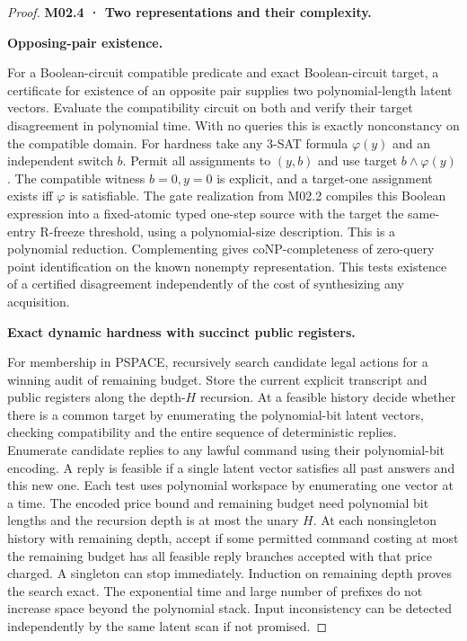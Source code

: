 \begin{proof}
\textbf{M02.4 · Two representations and their complexity.}

\textbf{Opposing-pair existence.}

For a Boolean-circuit compatible predicate and exact Boolean-circuit target, a certificate for existence of an opposite pair supplies two polynomial-length latent vectors. Evaluate the compatibility circuit on both and verify their target disagreement in polynomial time. With no queries this is exactly nonconstancy on the compatible domain. For hardness take any 3-SAT formula \(\varphi(y)\) and an independent switch \(b\). Permit all assignments to \((y,b)\) and use target \(b\land \varphi(y)\). The compatible witness \(b=0,y=0\) is explicit, and a target-one assignment exists iff \(\varphi\) is satisfiable. The gate realization from M02.2 compiles this Boolean expression into a fixed-atomic typed one-step source with the target the same-entry R-freeze threshold, using a polynomial-size description. This is a polynomial reduction. Complementing gives coNP-completeness of zero-query point identification on the known nonempty representation. This tests existence of a certified disagreement independently of the cost of synthesizing any acquisition.

\textbf{Exact dynamic hardness with succinct public registers.}

For membership in PSPACE, recursively search candidate legal actions for a winning audit of remaining budget. Store the current explicit transcript and public registers along the depth-\(H\) recursion. At a feasible history decide whether there is a common target by enumerating the polynomial-bit latent vectors, checking compatibility and the entire sequence of deterministic replies. Enumerate candidate replies to any lawful command using their polynomial-bit encoding. A reply is feasible if a single latent vector satisfies all past answers and this new one. Each test uses polynomial workspace by enumerating one vector at a time. The encoded price bound and remaining budget need polynomial bit lengths and the recursion depth is at most the unary \(H\). At each nonsingleton history with remaining depth, accept if some permitted command costing at most the remaining budget has all feasible reply branches accepted with that price charged. A singleton can stop immediately. Induction on remaining depth proves the search exact. The exponential time and large number of prefixes do not increase space beyond the polynomial stack. Input inconsistency can be detected independently by the same latent scan if not promised.


\end{proof}
